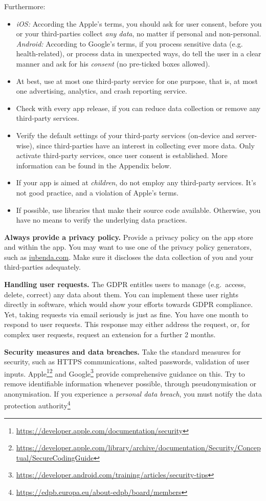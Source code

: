 \documentclass[
	12pt,
	a4paper,
	]{scrartcl}
\begin{document}
	Furthermore:
	\begin{itemize}
		\item
		\textit{iOS:} According the Apple's terms, you should ask
		for user consent, before you or your third-parties collect 
		\emph{any data}, no matter if personal and non-personal.\\	
		\textit{Android:}  According
		to Google's terms, if you process sensitive data (e.g. 
		health-related), 
		or process data in unexpected ways, do tell the user in a clear 
		manner 
		and ask for his \textit{consent} (no pre-ticked boxes allowed).
		\item At best, use at most one third-party service for one 
		purpose, 
		that is, at most one advertising, analytics, and crash reporting 
		service.
		\item Check with every app release, if you can reduce data 
		collection or remove any third-party services.
		\item Verify the default settings of your third-party services 
		(on-device and server-wise), since third-parties have an interest 
		in 
		collecting ever more data.
		Only activate third-party services, once user consent is 
		established. More information can be
		found in the Appendix below.
		\item If your app is aimed at \textit{children}, do not employ any 
		third-party services. It's not good practice, and a
		violation of Apple's terms.
		\item If possible, use libraries that make their source code available. Otherwise, you have no means to verify the underlying data practices.
	\end{itemize}
	
	\textbf{Always provide a privacy policy.}
	Provide a privacy policy on the app store and within the app.
	You may want to use one of the privacy policy generators, such as 
	\url{iubenda.com}.
	Make sure it discloses the data collection of you and your 
	third-parties 
	adequately.
	
	\textbf{Handling user requests.}
	The GDPR entitles users to manage
	(e.g.~access, delete, correct) any data about them. You can implement
	these user rights directly in software, which would show your efforts
	towards GDPR compliance. Yet, taking requests via email seriously is
	just as fine. You have one month to respond to user requests. This
	response may either address the request, or, for complex user requests,
	request an extension for a further 2 months.
	
	\textbf{Security measures and data breaches.}
	Take the standard measures for security, such as HTTPS communications, 
	salted passwords, validation of user inputs.
	Apple\footnote{\url{https://developer.apple.com/documentation/security}}\footnote{\url{https://developer.apple.com/library/archive/documentation/Security/Conceptual/SecureCodingGuide}}
	 and 
	Google\footnote{\url{https://developer.android.com/training/articles/security-tips}}
	 provide comprehensive guidance on this.
	Try to remove identifiable information whenever possible, through 
	pseudonymisation or anonymisation.
	If you experience a \textit{personal data breach}, you must notify the 
	data protection 
	authority\footnote{\url{https://edpb.europa.eu/about-edpb/board/members}}
	 
\end{document}
